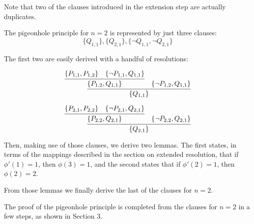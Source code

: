 \begin{appendices}
Note that two of the clauses introduced in the extension step are actually duplicates.

The pigeonhole principle for $n=2$ is represented by just three clauses:
\[\{Q_{1,1}\}, \{Q_{2,1}\}, \{\neg Q_{1,1}, \neg Q_{2,1}\}\]

The first two are easily derived with a handful of resolutions:

\[
\infer{\{Q_{1,1}\}}{
  \infer{\{P_{1,2},Q_{1,1}\}}{
    \{P_{1,1},P_{1,2}\}
    &
    \{\neg P_{1,1},Q_{1,1}\}
  }
  &
  \{\neg P_{1,2}, Q_{1,1}\}
}
\]

\[
\infer{\{Q_{2,1}\}}{
  \infer{\{P_{2,2},Q_{2,1}\}}{
    \{P_{2,1},P_{2,2}\}
    &
    \{\neg P_{2,1},Q_{2,1}\}
  }
  &
  \{\neg P_{2,2}, Q_{2,1}\}
}
\]

Then, making use of those clauses, we derive two lemmas. The first states, in terms of the mappings described in the section on extended resolution, that if $\phi'(1) = 1$, then $\phi(3) = 1$, and the second states that if $\phi'(2) = 1$, then $\phi(2) = 2$.



From those lemmas we finally derive the last of the clauses for $n=2$.


The proof of the pigeonhole principle is completed from the clauses for $n=2$ in a few steps, as shown in Section 3.


\end{appendices}
